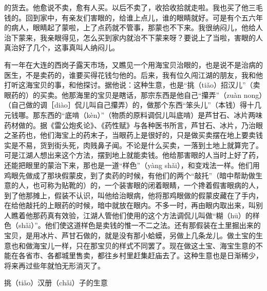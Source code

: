 \documentclass[12pt,UTF8]{ctexbook}
\begin{document}
的货去。他愈说不卖，愈有人买。以后不卖了，收拾收拾就走啦。我也买了他三毛钱的。回到家中，有亲友们害眼的，给谁上点儿，谁的眼睛就好。可是有个五六年的病人，眼睛起了蒙啦，上了点药就不管事，那蒙也不下来。我很纳闷儿，他给人治下蒙来，我亲眼得见，怎么买到家内就治不下蒙来呀？要说上了当啦，害眼的人真治好了几个，这事真叫人纳闷儿。

有一年在大连的西岗子露天市场，又瞧见一个用海宝贝治眼的，也是说不是治病的医生，不是卖药的，谁要买得花钱匀他的。后来，我有位久闯江湖的朋友，我和他打听这海宝贝的事，和他探讨。据他说：这种生意，也是“挑（tiǎo）招汉儿”（卖眼药的）的买卖。他那海里的宝贝是瞎话，那宗东西是他自己“攥弄”（zuàn nong）（自己做的调［diào］侃儿叫自己攥弄）的，做那个东西“笨头儿”（本钱）得十几元钱哪。那东西的“底啃（kèn）”（物质的原料调侃儿叫底啃）是芦甘石、冰片两味药材做的。据《雷公炮炙论》、《药性赋》与各种医书所言，芦甘石、冰片，乃治眼之圣药也，他们海宝上的药末子，当眼药上是很好的，只是做买卖摆在地上要卖钱实是不易，货到街头死，肉贱鼻子闻。不论是什么买卖，一落到土地上就算完了。可是江湖人想出来这个方法，摆到地上就能卖钱。他给那害眼的人当时上好了药，还能把眼里的蒙治下来，那也是一道“样色”（yàng shǎi），和变戏法一样。他们用鸡眼先做成了那块假蒙皮，到了卖药的时候，有他们的两个“敲托”（暗中帮助做生意的人，也可称为贴靴的）的，一个装害眼的闭着眼睛，一个搀着假害眼病的人，到了他那摊上，假装不认识，叫他给治眼病，他将那鸡眼做的假蒙皮藏在了手内，在给他敲托的上眼药的时候，暗中就放在眼内。不多一时，再由眼内取出来，叫别人瞧着他那药真有效验，江湖人管他们使用的这个方法调侃儿叫做“糊（hū）的样色（shǎi）”。他们使这道样色是卖钱的惟一不二之法。还有那假装在土里掘出来的宝贝，是用冰片、芦甘石做的，就是没有那小蛤蟆，另做上几条龙儿。做土宝的生意也和做海宝儿一样，只在那宝贝的样式不同罢了。现在做这土宝、海宝生意的不能在各省市、各都城里售卖，都往乡村里赶集赶庙去了。这种生意也是日渐稀少，将来再过些年就怕无形消灭了。





挑（tiǎo）汉册（chǎi）子的生意
\end{document}
